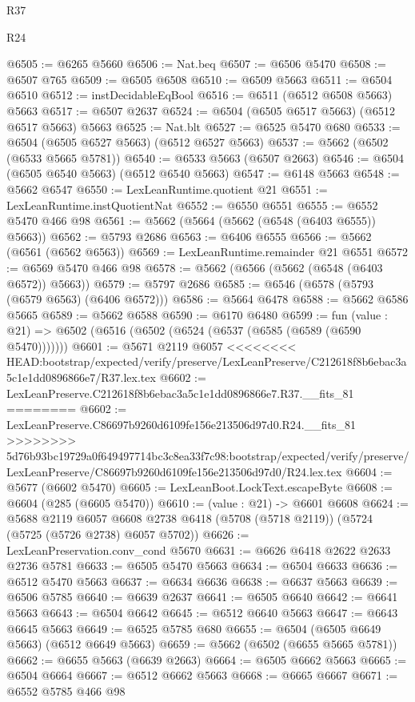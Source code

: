 \begin{lexlean}{R37}
\begin{lexlean}{R24}
\begin{coremodule}
{{{{{{{{{{{{{{{{{{{{{{{{{{{{{{{{{{{{{{{{{{{{{{{{{{{{{{{{{{{{{{{{{{{{{{{{{{{{{{{{{{{{{{{{{{{{{{{{{{{{{{{{{{{{{{{{{{{{{{{{{{{{{{{{{{{{{{{{{{{{{{{{{{{{{{{{{{{{{{{{{{{{{{{{{{{{{{{{{{{{{{{{{@6505 := @6265 @5660
@6506 := Nat.beq
@6507 := @6506 @5470
@6508 := @6507 @765
@6509 := @6505 @6508
@6510 := @6509 @5663
@6511 := @6504 @6510
@6512 := instDecidableEqBool
@6516 := @6511 (@6512 @6508 @5663) @5663
@6517 := @6507 @2637
@6524 := @6504 (@6505 @6517 @5663) (@6512 @6517 @5663) @5663
@6525 := Nat.blt
@6527 := @6525 @5470 @680
@6533 := @6504 (@6505 @6527 @5663) (@6512 @6527 @5663)
@6537 := @5662 (@6502 (@6533 @5665 @5781))
@6540 := @6533 @5663 (@6507 @2663)
@6546 := @6504 (@6505 @6540 @5663) (@6512 @6540 @5663)
@6547 := @6148 @5663
@6548 := @5662 @6547
@6550 := LexLeanRuntime.quotient @21
@6551 := LexLeanRuntime.instQuotientNat
@6552 := @6550 @6551
@6555 := @6552 @5470 @466 @98
@6561 := @5662 (@5664 (@5662 (@6548 (@6403 @6555)) @5663))
@6562 := @5793 @2686
@6563 := @6406 @6555
@6566 := @5662 (@6561 (@6562 @6563))
@6569 := LexLeanRuntime.remainder @21 @6551
@6572 := @6569 @5470 @466 @98
@6578 := @5662 (@6566 (@5662 (@6548 (@6403 @6572)) @5663))
@6579 := @5797 @2686
@6585 := @6546 (@6578 (@5793 (@6579 @6563) (@6406 @6572)))
@6586 := @5664 @6478
@6588 := @5662 @6586 @5665
@6589 := @5662 @6588
@6590 := @6170 @6480
@6599 := fun (value : @21) => @6502 (@6516 (@6502 (@6524 (@6537 (@6585 (@6589 (@6590 @5470)))))))
@6601 := @5671 @2119 @6057
<<<<<<<< HEAD:bootstrap/expected/verify/preserve/LexLeanPreserve/C212618f8b6ebac3a5c1e1dd0896866e7/R37.lex.tex
@6602 := LexLeanPreserve.C212618f8b6ebac3a5c1e1dd0896866e7.R37.__fits_81
========
@6602 := LexLeanPreserve.C86697b9260d6109fe156e213506d97d0.R24.__fits_81
>>>>>>>> 5d76b93bc19729a0f649497714bc3c8ea33f7c98:bootstrap/expected/verify/preserve/LexLeanPreserve/C86697b9260d6109fe156e213506d97d0/R24.lex.tex
@6604 := @5677 (@6602 @5470)
@6605 := LexLeanBoot.LockText.escapeByte
@6608 := @6604 (@285 (@6605 @5470))
@6610 := (value : @21) -> @6601 @6608
@6624 := @5688
    @2119
    @6057
    @6608
    @2738
    @6418
    (@5708 (@5718 @2119))
    (@5724 (@5725 (@5726 @2738) @6057 @5702))
@6626 := LexLeanPreservation.conv_cond @5670
@6631 := @6626 @6418 @2622 @2633 @2736 @5781
@6633 := @6505 @5470 @5663
@6634 := @6504 @6633
@6636 := @6512 @5470 @5663
@6637 := @6634 @6636
@6638 := @6637 @5663
@6639 := @6506 @5785
@6640 := @6639 @2637
@6641 := @6505 @6640
@6642 := @6641 @5663
@6643 := @6504 @6642
@6645 := @6512 @6640 @5663
@6647 := @6643 @6645 @5663
@6649 := @6525 @5785 @680
@6655 := @6504 (@6505 @6649 @5663) (@6512 @6649 @5663)
@6659 := @5662 (@6502 (@6655 @5665 @5781))
@6662 := @6655 @5663 (@6639 @2663)
@6664 := @6505 @6662 @5663
@6665 := @6504 @6664
@6667 := @6512 @6662 @5663
@6668 := @6665 @6667
@6671 := @6552 @5785 @466 @98
}}}}}}}}}}}}}}}}}}}}}}}}}}}}}}}}}}}}}}}}}}}}}}}}}}}}}}}}}}}}}}}}}}}}}}}}}}}}}}}}}}}}}}}}}}}}}}}}}}}}}}}}}}}}}}}}}}}}}}}}}}}}}}}}}}}}}}}}}}}}}}}}}}}}}}}}}}}}}}}}}}}}}}}}}}}}}}}}}}}}}}}}}
\end{coremodule}
\end{lexlean}
\end{lexlean}
